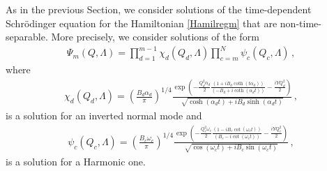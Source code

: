 \documentclass[12pt]{iopart}
\begin{document}
As in the previous Section, we consider solutions of the time-dependent Schr\"{o}dinger equation for the Hamiltonian \eqref{Hamilregm} that are non-time-separable. More precisely, we consider solutions of the form
\begin{align}
\Psi_{m}(Q,\Lambda)= \prod_{d=1}^{m-1}\chi_d(Q_d,\Lambda) \prod_{c=m}^{N}\psi_c(Q_c,\Lambda) \,,
\label{eq:funciondeondaacoplados}
\end{align}
where
\begin{align}\label{solIH}
\chi_d (Q_d,\Lambda) = \left(\frac{B_d \alpha_d }{\pi}\right)^{1/4} \frac{ \exp \left(-\frac{Q_d^2 \alpha_d}{2} \frac{\left(1+i B_d \coth \left(t
  \alpha_d\right)\right)}{ \left(-B_d+i  \coth \left( \alpha_d t\right)\right)}-\frac{i Y Q_d^2}{2} 
   \right)}{\sqrt{ \cosh \left(\alpha_d t\right)+i B_d \sinh \left( \alpha_d t \right)}}\,,
\end{align}
is a solution for an inverted normal mode and
\begin{align}
   \psi_c(Q_c,\Lambda)= \left( \frac{B_c \omega_c}{\pi} \right)^{1/4} \frac{\exp \left(- \frac{Q_c^2\omega_c}{2}\frac{ \left(1-i B_c \cot
   \left(\omega_c t\right)\right)}{ \left(B_c-i \cot \left( \omega_c t \right)\right)}-\frac{i Y Q_c^2}{2} \right)}{\sqrt{\cos \left( \omega_c t\right)+i
   B_c \sin \left( \omega_c t \right)}}  \,,\label{solHO}
\end{align}
is a solution for a Harmonic one. 
\end{document}
